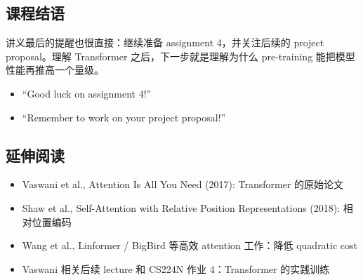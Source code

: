 \documentclass[a4paper]{article}
\begin{document}
\subsection{课程结语}





讲义最后的提醒也很直接：继续准备 assignment 4，并关注后续的 project proposal。理解 Transformer 之后，下一步就是理解为什么 pre-training 能把模型性能再推高一个量级。

\begin{itemize}
    \item ``Good luck on assignment 4!''
    \item ``Remember to work on your project proposal!''
\end{itemize}

\subsection{延伸阅读}

\begin{itemize}
    \item Vaswani et al., Attention Is All You Need (2017): Transformer 的原始论文
    \item Shaw et al., Self-Attention with Relative Position Representations (2018): 相对位置编码
    \item Wang et al., Linformer / BigBird 等高效 attention 工作：降低 quadratic cost
    \item Vaswani 相关后续 lecture 和 CS224N 作业 4：Transformer 的实践训练
\end{itemize}
\end{document}
